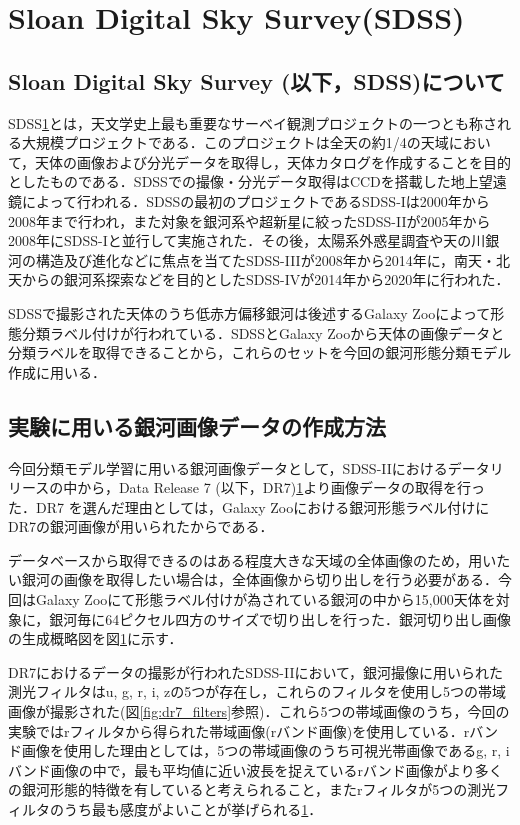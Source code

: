 \documentclass[a4j, 11pt]{jreport}
\begin{document}
\section{Sloan Digital Sky Survey(SDSS)}
\subsection*{Sloan Digital Sky Survey (以下，SDSS)について}
SDSS\ref{}とは，天文学史上最も重要なサーベイ観測プロジェクトの一つとも称される大規模プロジェクトである．このプロジェクトは全天の約1/4の天域において，天体の画像および分光データを取得し，天体カタログを作成することを目的としたものである．SDSSでの撮像・分光データ取得はCCDを搭載した地上望遠鏡によって行われる．SDSSの最初のプロジェクトであるSDSS-Iは2000年から2008年まで行われ，また対象を銀河系や超新星に絞ったSDSS-IIが2005年から2008年にSDSS-Iと並行して実施された．その後，太陽系外惑星調査や天の川銀河の構造及び進化などに焦点を当てたSDSS-IIIが2008年から2014年に，南天・北天からの銀河系探索などを目的としたSDSS-IVが2014年から2020年に行われた．

SDSSで撮影された天体のうち低赤方偏移銀河は後述するGalaxy Zooによって形態分類ラベル付けが行われている．SDSSとGalaxy Zooから天体の画像データと分類ラベルを取得できることから，これらのセットを今回の銀河形態分類モデル作成に用いる．
\subsection*{実験に用いる銀河画像データの作成方法}
今回分類モデル学習に用いる銀河画像データとして，SDSS-IIにおけるデータリリースの中から，Data Release 7 (以下，DR7)\ref{}より画像データの取得を行った．DR7 を選んだ理由としては，Galaxy Zooにおける銀河形態ラベル付けにDR7の銀河画像が用いられたからである．

データベースから取得できるのはある程度大きな天域の全体画像のため，用いたい銀河の画像を取得したい場合は，全体画像から切り出しを行う必要がある．今回はGalaxy Zooにて形態ラベル付けが為されている銀河の中から15,000天体を対象に，銀河毎に64ピクセル四方のサイズで切り出しを行った．銀河切り出し画像の生成概略図を図\ref{}に示す．

DR7におけるデータの撮影が行われたSDSS-IIにおいて，銀河撮像に用いられた測光フィルタはu, g, r, i, zの5つが存在し，これらのフィルタを使用し5つの帯域画像が撮影された(図\ref{fig:dr7_filters}参照)．これら5つの帯域画像のうち，今回の実験ではrフィルタから得られた帯域画像(rバンド画像)を使用している．rバンド画像を使用した理由としては，5つの帯域画像のうち可視光帯画像であるg, r, iバンド画像の中で，最も平均値に近い波長を捉えているrバンド画像がより多くの銀河形態的特徴を有していると考えられること，またrフィルタが5つの測光フィルタのうち最も感度がよいことが挙げられる\ref{}．
\end{document}
